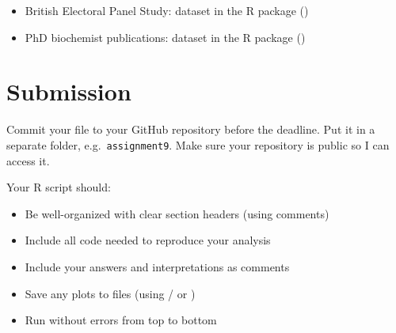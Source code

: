 \begin{itemize}
  \item British Electoral Panel Study:  dataset in the  R package ()
  \item PhD biochemist publications:  dataset in the  R package ()
\end{itemize}

\vspace{15pt}

\section{Submission}

Commit your file to your GitHub repository before the deadline. Put it in a separate folder, e.g.\ \texttt{assignment9}. Make sure your repository is public so I can access it.

Your R script should:
\begin{itemize}
  \item Be well-organized with clear section headers (using comments)
  \item Include all code needed to reproduce your analysis
  \item Include your answers and interpretations as comments
  \item Save any plots to files (using / or )
  \item Run without errors from top to bottom
\end{itemize}


